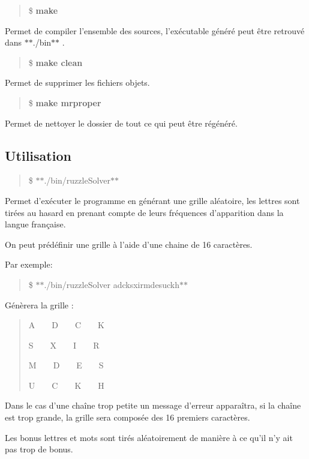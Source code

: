 \begin{quote}
\$ {\bfseries make} \end{quote}


Permet de compiler l'ensemble des sources, l'exécutable généré peut être retrouvé dans $\ast$$\ast$./bin$\ast$$\ast$ .

\begin{quote}
\$ {\bfseries make clean} \end{quote}


Permet de supprimer les fichiers objets.

\begin{quote}
\$ {\bfseries make mrproper} \end{quote}


Permet de nettoyer le dossier de tout ce qui peut être régénéré.

\subsection*{Utilisation}

\begin{quote}
\$ $\ast$$\ast$./bin/ruzzle\+Solver$\ast$$\ast$ \end{quote}


Permet d'exécuter le programme en générant une grille aléatoire, les lettres sont tirées au hasard en prenant compte de leurs fréquences d'apparition dans la langue française.

On peut prédéfinir une grille à l'aide d'une chaine de 16 caractères.

Par exemple\+:

\begin{quote}
\$ $\ast$$\ast$./bin/ruzzle\+Solver adcksxirmdesuckh$\ast$$\ast$ \end{quote}


Génèrera la grille \+:

\begin{quote}
A~~~~D~~~~C~~~~K

S~~~~X~~~~I~~~~R

M~~~~D~~~~E~~~~S

U~~~~C~~~~K~~~~H

\end{quote}


Dans le cas d'une chaîne trop petite un message d'erreur apparaîtra, si la chaîne est trop grande, la grille sera composée des 16 premiers caractères.

Les bonus lettres et mots sont tirés aléatoirement de manière à ce qu'il n'y ait pas trop de bonus.

